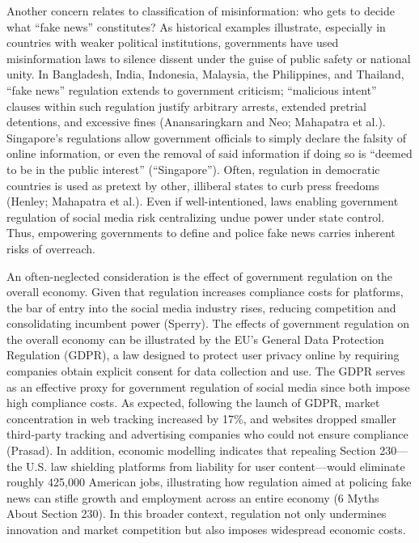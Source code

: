 \documentclass[12pt, a4paper, twoside]{article}
\begin{document}
Another concern relates to classification of misinformation: who gets to decide what “fake news” constitutes? As historical examples illustrate, especially in countries with weaker political institutions, governments have used misinformation laws to silence dissent under the guise of public safety or national unity. In Bangladesh, India, Indonesia, Malaysia, the Philippines, and Thailand, “fake news” regulation extends to government criticism; “malicious intent” clauses within such regulation justify arbitrary arrests, extended pretrial detentions, and excessive fines (Anansaringkarn and Neo; Mahapatra et al.). Singapore’s regulations allow government officials to simply declare the falsity of online information, or even the removal of said information if doing so is “deemed to be in the public interest” (“Singapore”). Often, regulation in democratic countries is used as pretext by other, illiberal states to curb press freedoms (Henley; Mahapatra et al.). Even if well-intentioned, laws enabling government regulation of social media risk centralizing undue power under state control. Thus, empowering governments to define and police fake news carries inherent risks of overreach. 

An often-neglected consideration is the effect of government regulation on the overall economy. Given that regulation increases compliance costs for platforms, the bar of entry into the social media industry rises, reducing competition and consolidating incumbent power (Sperry). The effects of government regulation on the overall economy can be illustrated by the EU’s General Data Protection Regulation (GDPR), a law designed to protect user privacy online by requiring companies obtain explicit consent for data collection and use. The GDPR serves as an effective proxy for government regulation of social media since both impose high compliance costs. As expected, following the launch of GDPR, market concentration in web tracking increased by 17\%, and websites dropped smaller third-party tracking and advertising companies who could not ensure compliance (Prasad). In addition, economic modelling indicates that repealing Section 230—the U.S. law shielding platforms from liability for user content—would eliminate roughly 425,000 American jobs, illustrating how regulation aimed at policing fake news can stifle growth and employment across an entire economy (6 Myths About Section 230). In this broader context, regulation not only undermines innovation and market competition but also imposes widespread economic costs. 
\end{document}

